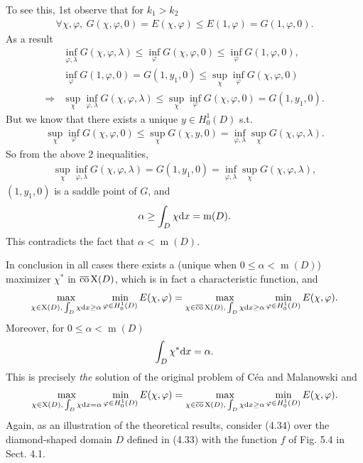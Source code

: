 \documentclass{book}
\numberwithin{equation}{section}
\begin{document}
\begin{enumerate}
    To see this, 1st observe that for $k_1 > k_2$
    \begin{align*}
        \forall\chi,\varphi,\ G(\chi,\varphi,0) = E(\chi,\varphi)\le E(1,\varphi) = G(1,\varphi,0).
    \end{align*}
    As a result
    \begin{align*}
        &\inf_{\varphi,\lambda} G(\chi,\varphi,\lambda)\le\inf_\varphi G(\chi,\varphi,0)\le\inf_\varphi G(1,\varphi,0),\\
        &\inf_\varphi G(1,\varphi,0) = G(1,y_1,0)\le\sup_\chi\inf_\varphi G(\chi,\varphi,0)\\
        \Rightarrow&\sup_\chi\inf_{\varphi,\lambda} G(\chi,\varphi,\lambda)\le\sup_\chi\inf_\varphi G(\chi,\varphi,0) = G(1,y_1,0).
    \end{align*}
    But we know that there exists a unique $y\in H_0^1(D)$ s.t.
    \begin{align*}
        \sup_\chi\inf_\varphi G(\chi,\varphi,0)\le\sup_\chi G(\chi,y,0) = \inf_{\varphi,\lambda}\sup_\chi G(\chi,\varphi,\lambda).
    \end{align*}
    So from the above 2 inequalities,
    \begin{align*}
        \sup_\chi\inf_{\varphi,\lambda} G(\chi,\varphi,\lambda) = G(1,y_1,0) = \inf_{\varphi,\lambda}\sup_\chi G(\chi,\varphi,\lambda),
    \end{align*}
    $(1,y_1,0)$ is a saddle point of $G$, and
    \begin{align*}
        \alpha\ge\int_D \chi{\rm d}x = \operatorname{m}(D).
    \end{align*}
    This contradicts the fact that $\alpha < \operatorname{m}(D)$.
    
    In conclusion in all cases there exists a (unique when $0\le\alpha < \operatorname{m}(D)$) maximizer $\chi^*$ in $\overline{\rm co}\operatorname{X}(D)$, which is in fact a characteristic function, and
    \begin{align*}
        \max_{\chi\in\operatorname{X}(D),\,\int_D \chi{\rm d}x\ge\alpha}\min_{\varphi\in H_0^1(D)} E(\chi,\varphi) = \max_{\chi\in\overline{\rm co}\operatorname{X}(D),\,\int_D \chi{\rm d}x\ge\alpha}\min_{\varphi\in H_0^1(D)} E(\chi,\varphi).
    \end{align*}
    Moreover, for $0\le\alpha < \operatorname{m}(D)$
    \begin{align*}
        \int_D \chi^*{\rm d}x = \alpha.
    \end{align*}
    This is precisely \textit{the} solution of the original problem of Céa and Malanowski and
    \begin{align*}
        \max_{\chi\in\operatorname{X}(D),\,\int_D \chi{\rm d}x = \alpha}\min_{\varphi\in H_0^1(D)} E(\chi,\varphi) = \max_{\chi\in\overline{\rm co}\operatorname{X}(D),\,\int_D \chi{\rm d}x\ge\alpha}\min_{\varphi\in H_0^1(D)} E(\chi,\varphi).
    \end{align*}
    Again, as an illustration of the theoretical results, consider (4.34) over the diamond-shaped domain $D$ defined in (4.33) with the function $f$ of Fig. 5.4 in Sect. 4.1.
    

\end{enumerate}
\end{document}
